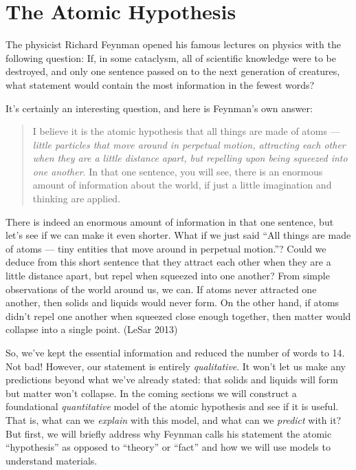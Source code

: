 \documentclass{book}
\begin{document}
\hypertarget{the-atomic-hypothesis}{%
\section{The Atomic Hypothesis}\label{the-atomic-hypothesis}}

The physicist Richard Feynman opened his famous lectures on physics with the
following question: If, in some cataclysm, all of scientific knowledge were to
be destroyed, and only one sentence passed on to the next generation of
creatures, what statement would contain the most information in the fewest
words?

It's certainly an interesting question, and here is Feynman's own answer:

\begin{quote}
I believe it is the atomic hypothesis that all things are made of atoms ---
\emph{little particles that move around in perpetual motion, attracting each
other when they are a little distance apart, but repelling upon being squeezed
into one another}. In that one sentence, you will see, there is an enormous
amount of information about the world, if just a little imagination and
thinking are applied.
\end{quote}

There is indeed an enormous amount of information in that one sentence, but
let's see if we can make it even shorter. What if we just said ``All things
are made of atoms --- tiny entities that move around in perpetual motion.''?
Could we deduce from this short sentence that they attract each other when
they are a little distance apart, but repel when squeezed into one another?
From simple observations of the world around us, we can. If atoms never
attracted one another, then solids and liquids would never form. On the other
hand, if atoms didn't repel one another when squeezed close enough together,
then matter would collapse into a single point. (LeSar 2013)

So, we've kept the essential information and reduced the number of words to
14. Not bad! However, our statement is entirely \emph{qualitative}. It won't
let us make any predictions beyond what we've already stated: that solids and
liquids will form but matter won't collapse. In the coming sections we will
construct a foundational \emph{quantitative} model of the atomic hypothesis
and see if it is useful. That is, what can we \emph{explain} with this model,
and what can we \emph{predict} with it? But first, we will briefly address why
Feynman calls his statement the atomic ``hypothesis'' as opposed to ``theory''
or ``fact'' and how we will use models to understand materials.
\end{document}
